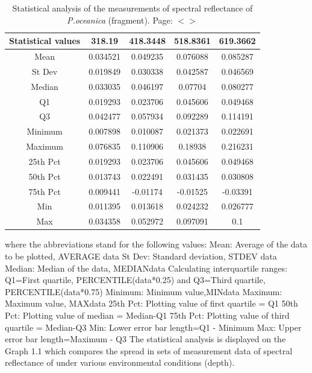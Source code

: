 \documentclass[11pt]{article}
\begin{document}
\begin{table}
\caption{Statistical analysis of the measurements of spectral reflectance of \textit{P.oceanica} (fragment). Page: $<$\pageref{page-40}$>$}
\centering
  \begin{tabular}{| c | c | c | c | c |}
    \hline
   	 \textbf{Statistical values} & \textbf{318.19} & \textbf{418.3448} & \textbf{518.8361} & \textbf{619.3662} \\ \hline \hline
	    Mean & 0.034521 & 0.049235 & 0.076088 & 0.085287 \\ \hline
	    St Dev & 0.019849 & 0.030338 & 0.042587 & 0.046569 \\ \hline
	   Median & 0.033035 & 0.046197 & 0.07704 & 0.080277 \\ \hline
	   Q1 & 0.019293 & 0.023706 & 0.045606& 0.049468 \\ \hline
	   Q3 & 0.042477 & 0.057934 & 0.092289 & 0.114191 \\ \hline
	   Minimum & 0.007898 & 0.010087 & 0.021373 & 0.022691 \\ \hline
	   Maximum & 0.076835 & 0.110906 & 0.18938 & 0.216231 \\ \hline
	   25th Pct & 0.019293 & 0.023706 & 0.045606 & 0.049468 \\ \hline
	   50th Pct & 0.013743 & 0.022491 & 0.031435 & 0.030808 \\ \hline
	   75th Pct & 0.009441 & -0.01174 & -0.01525 & -0.03391 \\ \hline
	   Min & 0.011395 & 0.013618 & 0.024232 & 0.026777 \\ \hline
	   Max & 0.034358 & 0.052972 & 0.097091 & 0.1 \\ \hline
  \end{tabular}
   \label{tab:4}
\end{table}

where the abbreviations stand for the following values:
Mean: Average of the data to be plotted, AVERAGE {data}
St Dev: Standard deviation, \ac{STDEV} {data}
Median: Median of the data, MEDIAN{data}
Calculating interquartile ranges: Q1=First quartile, PERCENTILE({data}*0.25) and Q3=Third
quartile, PERCENTILE({data}*0.75)
Minimum: Minimum value,MIN{data}
Maximum: Maximum value, MAX{data}
25th Pct: Plotting value of first quartile = Q1
50th Pct: Plotting value of median = Median-Q1
75th Pct: Plotting value of third quartile = Median-Q3
Min: Lower error bar length=Q1 - Minimum
Max: Upper error bar length=Maximum - Q3
The statistical analysis is displayed on the Graph 1.1 which compares the spread in sets of
measurement data of spectral reflectance of under various environmental conditions (depth).
\end{document}
